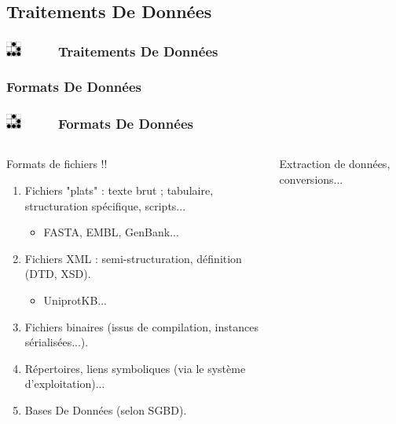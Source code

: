 \documentclass[slidetop,11pt]{beamer}
\def\sectionPartIb{Traitements De Donn{\'e}es}
\def\sectionPartIbUN{Formats De Donn{\'e}es}
\def\moreInFrameTitle{\includegraphics[height=0.5cm]{img/logo_glider.png}~~~~~}
\begin{document}
\subsection{\sectionPartIb}
\begin{frame}
	\frametitle{\moreInFrameTitle \sectionPartIb}
	\tableofcontents[sections=2,subsectionstyle=show/shaded/hide,subsubsectionstyle=show/show/hide]
\end{frame} 

\subsubsection{\sectionPartIbUN}
\begin{frame}
	\frametitle{\moreInFrameTitle \sectionPartIbUN}
	\begin{columns}[t]
	\begin{column}[c]{6cm}
		\begin{beamerboxesrounded}	[lower=substructureUN, %
		 				 upper=block title UN,%
						 shadow=true]%
		       {Formats de fichiers !!}
		        \begin{enumerate}
				\item Fichiers "plats" : texte brut ; tabulaire, structuration sp{\'e}cifique, scripts...
					\begin{itemize} \item FASTA, EMBL, GenBank... \end{itemize}
				\item Fichiers XML : semi-structuration, d{\'e}finition (DTD, XSD). 
					\begin{itemize} \item UniprotKB... \end{itemize}
				\item Fichiers binaires (issus de compilation, instances s{\'e}rialis{\'e}es...). 
				\item R{\'e}pertoires, liens symboliques (via le syst{\`e}me d'exploitation)...
				\item Bases De Donn{\'e}es (selon SGBD). 
			\end{enumerate}
		 \end{beamerboxesrounded}
	\end{column}
	\begin{column}[c]{6cm}
		 \begin{beamerboxesrounded}	[lower=substructureTR, %
		 				 upper=block title TR,%
						 shadow=true]%
		       {Extraction de donn{\'e}es, conversions...}
		        \begin{itemize}

\end{itemize}
\end{beamerboxesrounded}
\end{column}
\end{columns}
\end{frame}
\end{document}
